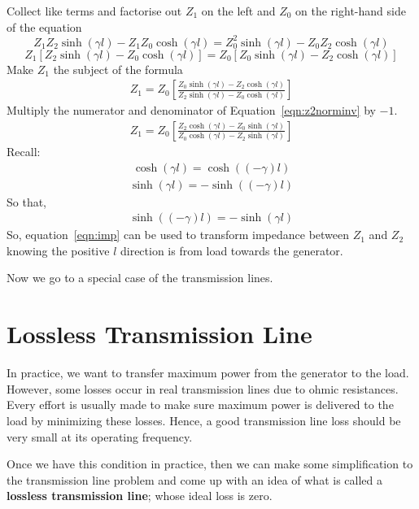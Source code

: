 Collect like terms and factorise out $Z_1$ on the left and $Z_0$ on the right-hand side of the equation
\begin{dmath*}
Z_1Z_2\sinh(\gamma l) - Z_1Z_0\cosh(\gamma l) = Z_0^2\sinh(\gamma l) - Z_0Z_2\cosh(\gamma l)
\end{dmath*}
\begin{dmath*}
Z_1\left[Z_2\sinh(\gamma l) - Z_0\cosh(\gamma l)\right] = Z_0\left[Z_0\sinh(\gamma l) - Z_2\cosh(\gamma l)\right]
\end{dmath*}
Make $Z_1$ the subject of the formula
\begin{align}
Z_1 = Z_0\left[\frac{Z_0\sinh(\gamma l) - Z_2\cosh(\gamma l)}{Z_2\sinh(\gamma l) - Z_0\cosh(\gamma l)}\right]
\label{eqn:z2norminv}
\end{align}
Multiply the numerator and denominator of Equation~\ref{eqn:z2norminv} by $-1$.
\begin{align*}
Z_1 = Z_0\left[\frac{Z_2\cosh(\gamma l) - Z_0\sinh(\gamma l)}{Z_0\cosh(\gamma l) - Z_2\sinh(\gamma l)}\right]
\end{align*}
Recall:
\begin{align*}
\cosh(\gamma l) = \cosh((-\gamma) l)
\end{align*}
\begin{align*}
\sinh(\gamma l) = -\sinh((-\gamma) l)
\end{align*}
So that,
\begin{align*}
\sinh((-\gamma) l) = -\sinh(\gamma l)
\end{align*}
So, equation~\ref{eqn:imp} can be used to transform impedance between $Z_1$ and $Z_2$ knowing the positive $l$ direction is from load towards the generator.

Now we go to a special case of the transmission lines.

\section{Lossless Transmission Line}
In practice, we want to transfer maximum power from the generator to the load. However, some losses occur in real transmission lines due to ohmic resistances. Every effort is usually made to make sure maximum power is delivered to the load by minimizing these losses. Hence, a good transmission line loss should be very small at its operating frequency. 

Once we have this condition in practice, then we can make some simplification to the transmission line problem and come up with an idea of what is called a \textbf{lossless transmission line}; whose ideal loss is zero.

